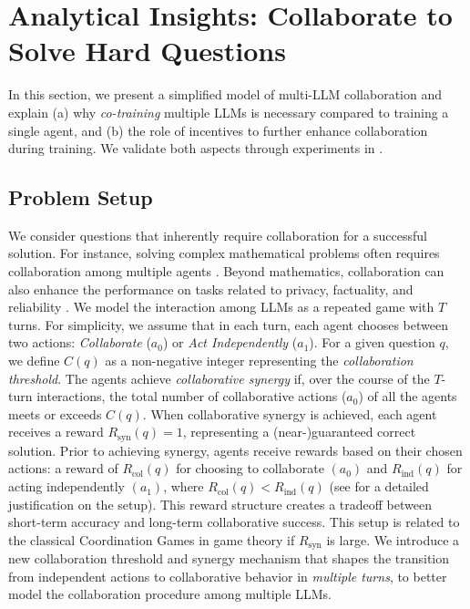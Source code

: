 \safevspace{-2.2mm}

\section{Analytical Insights: Collaborate  to Solve Hard Questions}
\safevspace{-2.2mm}
\label{sec:theory}
In this section, we present a simplified model of multi-LLM collaboration and explain (a) why {\it co-training}  multiple LLMs is necessary compared to training a single agent,  and (b) the role of incentives to further enhance collaboration during training. We validate both aspects through experiments in .
\safevspace{-2.2mm}


\subsection{Problem Setup}
\safevspace{-2.2mm}

We consider questions that inherently require collaboration for a successful solution. For instance, solving complex mathematical problems often requires  collaboration  among  multiple agents \citep{liang2023encouraging, du2023improving}. Beyond mathematics, collaboration can also enhance the performance on tasks related to privacy, factuality, and reliability \citep{feng2025llmdroolsmultillmcollaboration}.
{We model the interaction among LLMs as a repeated game with $T$ turns}. 
For simplicity, we assume that in each turn, each agent chooses between two actions: \textit{Collaborate} ($a_0$) or \textit{Act Independently} ($a_1$). For a given question $q$, we define \(C(q)\) as a non-negative integer representing the \textit{collaboration threshold}. The agents achieve \textit{collaborative synergy} if, over the course of the $T$-turn interactions, the total number of collaborative actions (\(a_0\)) of all the agents meets or exceeds \(C(q)\).
When collaborative synergy is achieved, each agent receives a reward \(R_{\text{syn}}(q) = 1\), representing a (near-)guaranteed  correct solution. Prior to achieving synergy, agents receive rewards based on their chosen actions: a reward of \(R_{\text{col}}(q)\) for choosing to collaborate \((a_0)\) and \(R_{\text{ind}}(q)\) for acting independently \((a_1)\), where \(R_{\text{col}}(q) < R_{\text{ind}}(q)\) (see  for a detailed  justification on the setup). This reward structure creates a tradeoff between short-term accuracy and long-term collaborative success. {This  setup is related to the classical Coordination Games  \cite{cooper1999coordination} in game theory if $R_{\text{syn}}$ is large}. We introduce a new collaboration threshold and synergy mechanism that shapes the transition from independent actions to collaborative behavior {in {\it multiple turns}}, to better model the collaboration procedure among multiple LLMs. 
\safevspace{-2.2mm}

